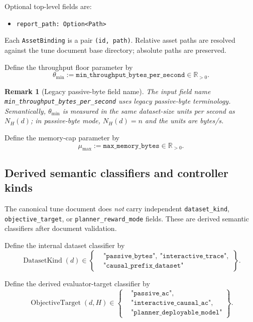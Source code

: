 \documentclass[11pt]{article}
\newtheorem{remark}{Remark}
\begin{document}
Optional top-level fields are:
\begin{itemize}
    \item \texttt{report\_path: Option<Path>}
\end{itemize}

Each \texttt{AssetBinding} is a pair \texttt{(id, path)}. Relative asset paths
are resolved against the tune document base directory; absolute paths are
preserved.

Define the throughput floor parameter by
\[
\theta_{\min}:=\texttt{min\_throughput\_bytes\_per\_second}\in\mathbb{R}_{>0}.
\]

\begin{remark}[Legacy passive-byte field name]
The input field name \texttt{min\_throughput\_bytes\_}\allowbreak\texttt{per\_second} uses legacy
passive-byte terminology. Semantically, $\theta_{\min}$ is measured in the same
dataset-size units per second as $N_H(d)$; in passive-byte mode, $N_H(d)=n$
and the units are bytes/s.
\end{remark}

Define the memory-cap parameter by
\[
\mu_{\max}:=\texttt{max\_memory\_bytes}\in\mathbb{R}_{>0}.
\]

\subsection{Derived semantic classifiers and controller kinds}

The canonical tune document does \emph{not} carry independent
\texttt{dataset\_kind}, \texttt{objective\_target}, or
\texttt{planner\_reward\_mode} fields. These are derived semantic classifiers
after document validation.

Define the internal dataset classifier by
\[
\operatorname{DatasetKind}(d)\in
\left\{
\begin{aligned}
&\texttt{"passive\_bytes"},\ \texttt{"interactive\_trace"},\\
&\texttt{"causal\_prefix\_dataset"}
\end{aligned}
\right\}.
\]

Define the derived evaluator-target classifier by
\[
\operatorname{ObjectiveTarget}(d,H)\in
\left\{
\begin{aligned}
&\texttt{"passive\_ac"},\\
&\texttt{"interactive\_causal\_ac"},\\
&\texttt{"planner\_}\allowbreak\texttt{deployable\_}\allowbreak\texttt{model"}
\end{aligned}
\right\}.
\]
\end{document}
